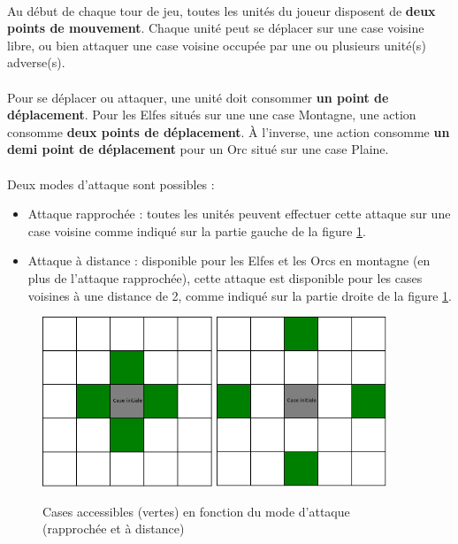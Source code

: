 \paragraph{}
Au début de chaque tour de jeu, toutes les unités du joueur disposent de \textbf{deux points de mouvement}. Chaque unité peut se déplacer sur une case voisine libre, ou bien attaquer une case voisine occupée par une ou plusieurs unité(s) adverse(s).

\paragraph{}
Pour se déplacer ou attaquer, une unité doit consommer \textbf{un point de déplacement}. Pour les Elfes situés sur une une case Montagne, une action consomme \textbf{deux points de déplacement}. À l'inverse, une action consomme \textbf{un demi point de déplacement} pour un Orc situé sur une case Plaine.

\paragraph{}
Deux modes d'attaque sont possibles :

\begin{itemize}
  \item Attaque rapprochée : toutes les unités peuvent effectuer cette attaque sur une case voisine comme indiqué sur la partie gauche de la figure \ref{fig:attack}.
  \item Attaque à distance : disponible pour les Elfes et les Orcs en montagne (en plus de l'attaque rapprochée), cette attaque est disponible pour les cases voisines à une distance de 2, comme indiqué sur la partie droite de la figure \ref{fig:attack}.
\end{itemize}

\begin{figure}
  \centering
  \includegraphics[width=2in]{./schemas/near_attack.png}
  \includegraphics[width=2in]{./schemas/long_attack.png}
  \caption{Cases accessibles (vertes) en fonction du mode d'attaque (rapprochée et à distance)}
  \label{fig:attack}
\end{figure}

